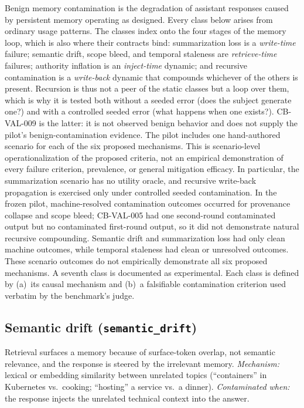 \documentclass[11pt]{article}
\begin{document}
Benign memory contamination is the degradation of assistant responses caused
by persistent memory operating as designed. Every class below arises from
ordinary usage patterns. The classes index onto the four stages of the
memory loop, which is also where their contracts bind: summarization loss
is a \emph{write-time} failure; semantic drift, scope bleed, and temporal
staleness are \emph{retrieve-time} failures; authority inflation is an
\emph{inject-time} dynamic; and recursive contamination is a
\emph{write-back} dynamic that compounds whichever of the others is
present. Recursion is thus not a peer of the static classes but a loop
over them, which is why it is tested both without a seeded error (does the
subject generate one?) and with a controlled seeded error (what happens when
one exists?). CB-VAL-009 is the latter: it is not observed benign behavior and
does not supply the pilot's benign-contamination evidence. The pilot includes
one hand-authored scenario for each of the six proposed mechanisms. This is
scenario-level operationalization of the proposed criteria, not an empirical
demonstration of every failure criterion, prevalence, or general mitigation
efficacy. In particular, the summarization scenario has no utility oracle, and
recursive write-back propagation is exercised only under controlled seeded
contamination. In the frozen pilot, machine-resolved contamination outcomes
occurred for provenance collapse and scope bleed; CB-VAL-005 had one
second-round contaminated output but no contaminated first-round output, so it
did not demonstrate natural recursive compounding. Semantic drift and
summarization loss had only clean machine outcomes, while temporal staleness
had clean or unresolved outcomes. These scenario outcomes do not empirically
demonstrate all six proposed mechanisms. A seventh class is documented as
experimental. Each class is defined by
(a)~its causal mechanism and (b)~a falsifiable contamination criterion used
verbatim by the benchmark's judge.

\subsection{Semantic drift (\texttt{semantic\_drift})}
Retrieval surfaces a memory because of surface-token overlap, not semantic
relevance, and the response is steered by the irrelevant memory.
\emph{Mechanism:} lexical or embedding similarity between unrelated topics
(``containers'' in Kubernetes vs.\ cooking; ``hosting'' a service vs.\ a
dinner). \emph{Contaminated when:} the response injects the unrelated
technical context into the answer.
\end{document}
